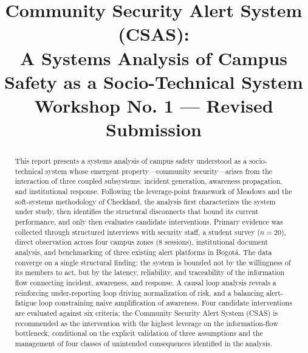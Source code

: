 \documentclass[conference]{IEEEtran}
\begin{document}
\title{Community Security Alert System (CSAS):\\
       A Systems Analysis of Campus Safety as a Socio-Technical System\\
       \large{Workshop No. 1 --- Revised Submission}}

\author{
\and
{}
\and
{}
\and
{}
\and
{}
}

\maketitle

\begin{abstract}
This report presents a systems analysis of campus safety understood as
a socio-technical system whose emergent property---community
security---arises from the interaction of three coupled subsystems:
incident generation, awareness propagation, and institutional response.
Following the leverage-point framework of Meadows and the soft-systems
methodology of Checkland, the analysis first characterizes the system
under study, then identifies the structural disconnects that bound its
current performance, and only then evaluates candidate interventions.
Primary evidence was collected through structured interviews with
security staff, a student survey (\(n=20\)), direct observation across
four campus zones (8 sessions), institutional document analysis, and
benchmarking of three existing alert platforms in Bogot\'a. The data
converge on a single structural finding: the system is bounded not by
the willingness of its members to act, but by the latency, reliability,
and traceability of the information flow connecting incident,
awareness, and response. A causal loop analysis reveals a reinforcing
under-reporting loop driving normalization of risk, and a balancing
alert-fatigue loop constraining naive amplification of awareness.
Four candidate interventions are evaluated against six criteria; the
Community Security Alert System (CSAS) is recommended as the
intervention with the highest leverage on the information-flow
bottleneck, conditional on the explicit validation of three assumptions
and the management of four classes of unintended consequences
identified in the analysis.
\end{abstract}
\end{document}
